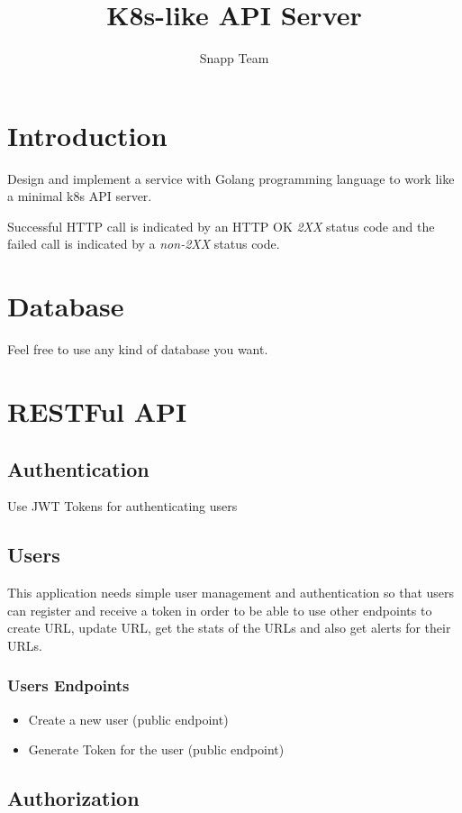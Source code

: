 \documentclass{article}
\begin{document}
\title{K8s-like API Server}
\author{Snapp Team}

\maketitle
\tableofcontents

\section{Introduction}
Design and implement a service with Golang programming language to work like a minimal k8s API server.

Successful HTTP call is indicated by an HTTP OK \textit{2XX} status code and the failed call is indicated by a \textit{non-2XX} status code.

\section{Database}

Feel free to use any kind of database you want.

\section{RESTFul API}
\subsection{Authentication}
Use JWT Tokens for authenticating users

\subsection{Users}
This application needs simple user management and authentication so that users can register and receive a token in order to be able to use other endpoints to create URL, update URL, get the stats of the URLs and also get alerts for their URLs.

\subsubsection{Users Endpoints}
\begin{itemize}
  \item Create a new user (public endpoint)
  \item Generate Token for the user (public endpoint)
\end{itemize}


\subsection{Authorization}
\end{document}
